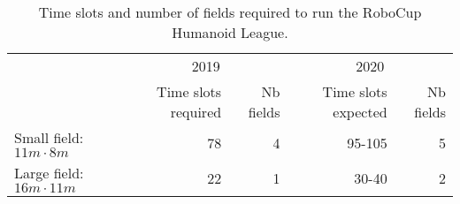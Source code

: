 \documentclass{article}
\begin{document}
\begin{table}[h]
  \centering
  \begin{tabular}{l|r|r|r|r|}
    & \multicolumn{2}{c}{2019} & \multicolumn{2}{c}{2020}\\
    & Time slots required & Nb fields & Time slots expected & Nb fields\\
    \hline
    Small field: $11m \cdot 8m$ & 78 & 4 & 95-105 & 5\\
    Large field: $16m \cdot 11m$ & 22 & 1 & 30-40 & 2\\
  \end{tabular}
  \caption{Time slots and number of fields required to run the RoboCup Humanoid League.}

\end{table}
\end{document}
